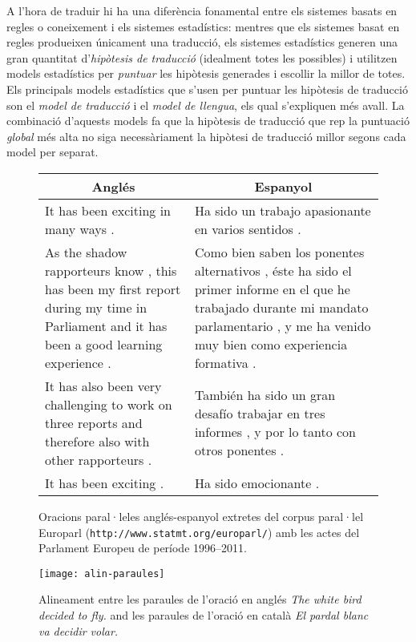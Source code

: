 A l'hora de traduir hi ha una diferència fonamental entre els sistemes
basats en regles o coneixement i els sistemes estadístics: mentres que
els sistemes basat en regles produeixen únicament una traducció, els
sistemes estadístics generen una gran quantitat d'\emph{hipòtesis de
  traducció} (idealment totes les possibles) i utilitzen models
estadístics per \emph{puntuar} les hipòtesis generades i escollir la
millor de totes. Els principals models estadístics que s'usen per
puntuar les hipòtesis de traducció son el \emph{model de traducció} i
el \emph{model de llengua}, els qual s'expliquen més avall. La
combinació d'aquests models fa que la hipòtesis de traducció que rep
la puntuació \emph{global} més alta no siga necessàriament la hipòtesi
de traducció millor segons cada model per separat.

\begin{figure}
\centering
\begin{tabular}{p{6cm}|p{6cm}}
  \multicolumn{1}{c|}{\textbf{Anglés}} & \multicolumn{1}{c}{\textbf{Espanyol}}\\
  \hline
  It has been exciting in many ways . &
  Ha sido un trabajo apasionante en varios sentidos . \\
  \hline
  As the shadow rapporteurs know , this has been my first report
  during my time in Parliament and it has been a good learning
  experience . &
  Como bien saben los ponentes alternativos , éste ha sido el primer
  informe en el que he trabajado durante mi mandato parlamentario , y
  me ha venido muy bien como experiencia formativa . \\
  \hline
  It has also been very challenging to work on three reports and
  therefore also with other rapporteurs . &
  También ha sido un gran desafío trabajar en tres informes , y por lo
  tanto con otros ponentes . \\
  \hline
  It has been exciting . &
  Ha sido emocionante . \\
  \hline
\end{tabular}
\caption{Oracions paral·leles anglés-espanyol extretes del corpus
  paral·lel Europarl (\texttt{http://www.statmt.org/europarl/}) amb
  les actes del Parlament Europeu de període 1996--2011.}
\label{fg:alinora}
\end{figure}


\begin{figure}
\centering
\texttt{[image: alin-paraules]}
\caption{Alineament entre les paraules de l'oració en anglés
  \emph{The white bird decided to fly.} and les paraules de l'oració en
català \emph{El pardal blanc va decidir volar.}}
\label{fg:alinpar}
\end{figure}

